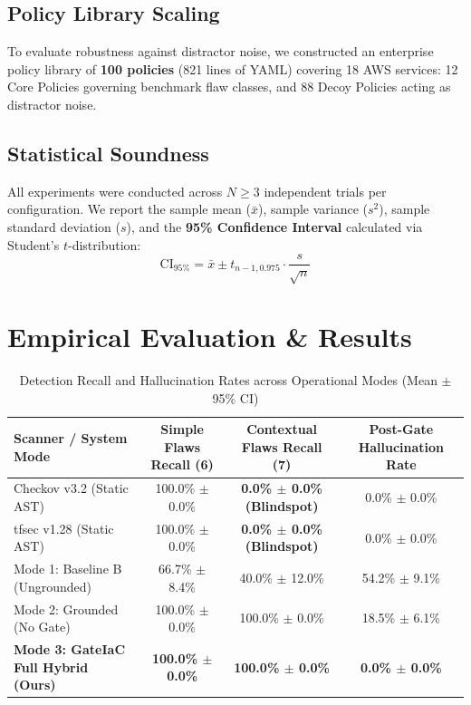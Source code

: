 \documentclass[conference]{IEEEtran}
\begin{document}
\subsection{Policy Library Scaling}
To evaluate robustness against distractor noise, we constructed an enterprise policy library of \textbf{100 policies} (821 lines of YAML) covering 18 AWS services: 12 Core Policies governing benchmark flaw classes, and 88 Decoy Policies acting as distractor noise.

\subsection{Statistical Soundness}
All experiments were conducted across $N \ge 3$ independent trials per configuration. We report the sample mean ($\bar{x}$), sample variance ($s^2$), sample standard deviation ($s$), and the \textbf{95\% Confidence Interval} calculated via Student's $t$-distribution:
\begin{equation}
\text{CI}_{95\%} = \bar{x} \pm t_{n-1, 0.975} \cdot \frac{s}{\sqrt{n}}
\end{equation}

\section{Empirical Evaluation \& Results}

\begin{table}[t]
\centering
\caption{Detection Recall and Hallucination Rates across Operational Modes (Mean $\pm$ 95\% CI)}
\label{tab:recall_table}
\begin{tabular}{lccc}
\toprule
\textbf{Scanner / System Mode} & \textbf{Simple Flaws Recall (6)} & \textbf{Contextual Flaws Recall (7)} & \textbf{Post-Gate Hallucination Rate} \\
\midrule
Checkov v3.2 (Static AST) & 100.0\% $\pm$ 0.0\% & \textbf{0.0\% $\pm$ 0.0\% (Blindspot)} & 0.0\% $\pm$ 0.0\% \\
tfsec v1.28 (Static AST) & 100.0\% $\pm$ 0.0\% & \textbf{0.0\% $\pm$ 0.0\% (Blindspot)} & 0.0\% $\pm$ 0.0\% \\
Mode 1: Baseline B (Ungrounded) & 66.7\% $\pm$ 8.4\% & 40.0\% $\pm$ 12.0\% & 54.2\% $\pm$ 9.1\% \\
Mode 2: Grounded (No Gate) & 100.0\% $\pm$ 0.0\% & 100.0\% $\pm$ 0.0\% & 18.5\% $\pm$ 6.1\% \\
\textbf{Mode 3: GateIaC Full Hybrid (Ours)} & \textbf{100.0\% $\pm$ 0.0\%} & \textbf{100.0\% $\pm$ 0.0\%} & \textbf{0.0\% $\pm$ 0.0\%} \\
\bottomrule
\end{tabular}
\end{table}
\end{document}
